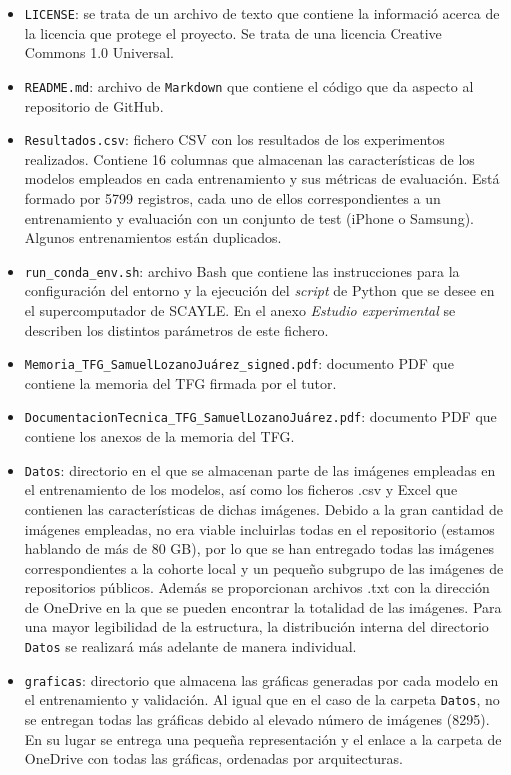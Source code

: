 \begin{itemize}
    \item \texttt{LICENSE}: se trata de un archivo de texto que contiene la informació acerca de la licencia que protege el proyecto. Se trata de una licencia Creative Commons 1.0 Universal.
    \item \texttt{README.md}: archivo de \texttt{Markdown} que contiene el código que da aspecto al repositorio de GitHub. 
    \item \texttt{Resultados.csv}: fichero CSV con los resultados de los experimentos realizados. Contiene 16 columnas que almacenan las características de los modelos empleados en cada entrenamiento y sus métricas de evaluación. Está formado por 5799 registros, cada uno de ellos correspondientes a un entrenamiento y evaluación con un conjunto de test (iPhone o Samsung). Algunos entrenamientos están duplicados.
    \item \texttt{run\_conda\_env.sh}: archivo Bash que contiene las instrucciones para la configuración del entorno y la ejecución del \textit{script} de Python que se desee en el supercomputador de SCAYLE. En el anexo \textit{Estudio experimental} se describen los distintos parámetros de este fichero.
    \item \texttt{Memoria\_TFG\_SamuelLozanoJuárez\_signed.pdf}: documento PDF que contiene la memoria del TFG firmada por el tutor.
    \item \texttt{DocumentacionTecnica\_TFG\_SamuelLozanoJuárez.pdf}: documento PDF que contiene los anexos de la memoria del TFG.
    \item \texttt{Datos}: directorio en el que se almacenan parte de las imágenes empleadas en el entrenamiento de los modelos, así como los ficheros .csv y Excel que contienen las características de dichas imágenes. Debido a la gran cantidad de imágenes empleadas, no era viable incluirlas todas en el repositorio (estamos hablando de más de 80 GB), por lo que se han entregado todas las imágenes correspondientes a la cohorte local y un pequeño subgrupo de las imágenes de repositorios públicos. Además se proporcionan archivos .txt con la dirección de OneDrive en la que se pueden encontrar la totalidad de las imágenes. Para una mayor legibilidad de la estructura, la distribución interna del directorio \texttt{Datos} se realizará más adelante de manera individual.
    \item \texttt{graficas}: directorio que almacena las gráficas generadas por cada modelo en el entrenamiento y validación. Al igual que en el caso de la carpeta \texttt{Datos}, no se entregan todas las gráficas debido al elevado número de imágenes (8295). En su lugar se entrega una pequeña representación y el enlace a la carpeta de OneDrive con todas las gráficas, ordenadas por arquitecturas.

\end{itemize}
